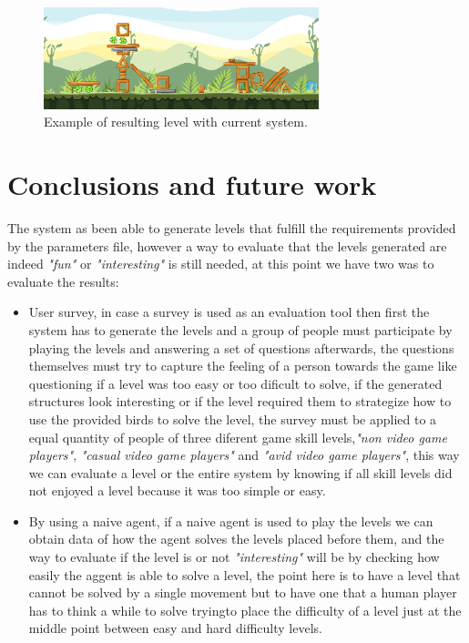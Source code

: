 \documentclass[conference]{IEEEtran}
\begin{document}
\begin{figure}[htbp]
    \centerline{\includegraphics[width=80mm]{Images/Result_n2.png}}
    \caption{Example of resulting level with current system.}
    \label{result_1}
\end{figure}

\section{Conclusions and future work}

The system as been able to generate levels that fulfill the requirements
 provided by the parameters file, however a way to evaluate that the levels
 generated are indeed \textit{"fun"} or \textit{"interesting"} is still needed,
 at this point we have two was to evaluate the results:
 \begin{itemize}
    \item User survey, in case a survey is used as an evaluation tool then first
    the system has to generate the levels and a group of people must participate
    by playing the levels and answering a set of questions afterwards, the
    questions themselves must try to capture the feeling of a person towards the
    game like questioning if a level was too easy or too dificult to solve, if
    the generated structures look interesting or if the level required them to
    strategize how to use the provided birds to solve the level, the survey must
    be applied to a equal quantity of people of three diferent game skill
    levels,\textit{"non video game players"}, \textit{"casual video game
    players"} and \textit{"avid video game players"}, this way we can evaluate a
    level or the entire system by knowing if all skill levels did not enjoyed a
    level because it was too simple or easy.
    \item By using a naive agent, if a naive agent is used to play the levels we
    can obtain data of how the agent solves the levels placed before them, and
    the way to evaluate if the level is or not \textit{"interesting"} will be by
    checking how easily the aggent is able to solve a level, the point here is
    to have a level that cannot be solved by a single movement but to have one
    that a human player has to think a while to solve tryingto place the
    difficulty of a level just at the middle point between easy and hard
    difficulty levels.
\end{itemize}
\end{document}
